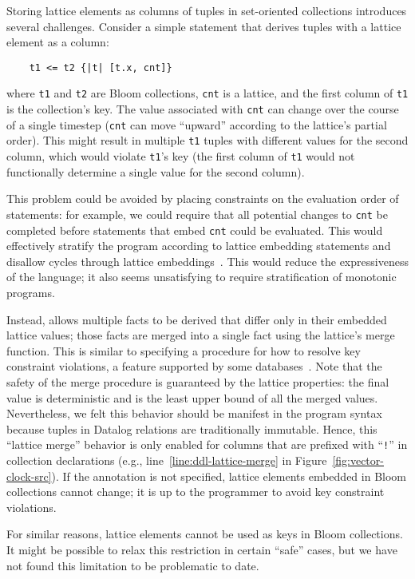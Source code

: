 Storing lattice elements as columns of tuples in set-oriented collections
introduces several challenges. Consider a simple \lang statement that derives
tuples with a lattice element as a column:
\begin{verbatim}
    t1 <= t2 {|t| [t.x, cnt]}
\end{verbatim}
where \texttt{t1} and \texttt{t2} are Bloom collections, \texttt{cnt} is a
lattice, and the first column of \texttt{t1} is the collection's key. The value
associated with \texttt{cnt} can change over the course of a single timestep
(\texttt{cnt} can move ``upward'' according to the lattice's partial
order). This might result in multiple \texttt{t1} tuples with different values
for the second column, which would violate \texttt{t1}'s key (the first column
of \texttt{t1} would not functionally determine a single value for the second
column).

This problem could be avoided by placing constraints on the evaluation order of
statements: for example, we could require that all potential changes to
\texttt{cnt} be completed before statements that embed \texttt{cnt} could be
evaluated. This would effectively stratify the program according to lattice
embedding statements and disallow cycles through lattice
embeddings~\cite{Apt1988}.  This would reduce the expressiveness of the
language; it also seems unsatisfying to require stratification of monotonic
programs.

Instead, \lang allows multiple facts to be derived that differ only in their
embedded lattice values; those facts are merged into a single fact using the
lattice's merge function. This is similar to specifying a procedure for how to
resolve key constraint violations, a feature supported by some
databases~\cite{oracle-conflict,sqlite-on-conflict}. Note that the safety of the
merge procedure is guaranteed by the lattice properties: the final value is
deterministic and is the least upper bound of all the merged
values. Nevertheless, we felt this behavior should be manifest in the program
syntax because tuples in Datalog relations are traditionally immutable. Hence,
this ``lattice merge'' behavior is only enabled for columns that are prefixed
with ``\texttt{!}'' in collection declarations (e.g.,
line~\ref{line:ddl-lattice-merge} in Figure~\ref{fig:vector-clock-src}). If the
annotation is not specified, lattice elements embedded in Bloom collections
cannot change; it is up to the programmer to avoid key constraint violations.

For similar reasons, lattice elements cannot be used as keys in Bloom
collections. It might be possible to relax this restriction in certain ``safe''
cases, but we have not found this limitation to be problematic to date.

